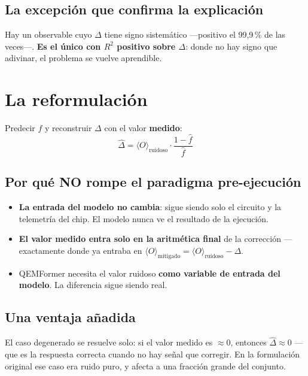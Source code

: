 \subsection{La excepción que confirma la explicación}
Hay un observable cuyo $\Delta$ tiene signo sistemático —positivo el 99,9\,\% de las veces—.
\textbf{Es el único con $R^2$ positivo sobre $\Delta$}: donde no hay signo que adivinar, el
problema se vuelve aprendible.

\section{La reformulación}
\label{sec:reformulacion}
Predecir $f$ y reconstruir $\Delta$ con el valor \textbf{medido}:
\begin{equation}
\hat\Delta = \langle O \rangle_{\text{ruidoso}}\cdot\frac{1 - \hat f}{\hat f}
\end{equation}

\subsection{Por qué NO rompe el paradigma pre-ejecución}
\begin{itemize}
    \item \textbf{La entrada del modelo no cambia}: sigue siendo solo el circuito y la
          telemetría del chip. El modelo nunca ve el resultado de la ejecución.
    \item \textbf{El valor medido entra solo en la aritmética final} de la corrección —
          exactamente donde ya entraba en $\langle O \rangle_{\text{mitigado}} = \langle O
          \rangle_{\text{ruidoso}} - \Delta$.
    \item QEMFormer necesita el valor ruidoso \textbf{como variable de entrada del modelo}.
          La diferencia sigue siendo real.
\end{itemize}

\subsection{Una ventaja añadida}
El caso degenerado se resuelve solo: si el valor medido es $\approx 0$, entonces
$\hat\Delta \approx 0$ — que es la respuesta correcta cuando no hay señal que corregir. En la
formulación original ese caso era ruido puro, y afecta a una fracción grande del conjunto.

